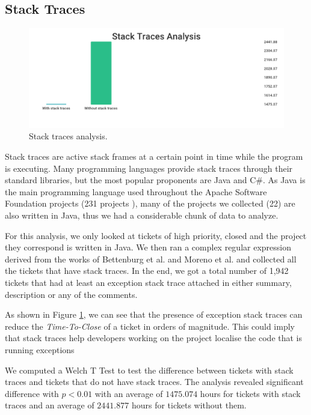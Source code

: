 \documentclass{mpaper}
\begin{document}
\vskip12pt

\subsection{Stack Traces}

\begin{figure}[ht]
  \begin{center}
    \includegraphics[scale=0.25]{images/stack_traces.png}
  \end{center}
  \caption{\label{stack_traces}Stack traces analysis.}
\end{figure}

Stack traces are active stack frames at a certain point in time while the program is executing. 
Many programming languages provide stack traces through their standard libraries, but the most 
popular proponents are Java and C\#. As Java is the main programming language used throughout 
the Apache Software Foundation projects (231 projects \cite{apache_projects}), many of the projects 
we collected (22) are also written in Java, thus we had a considerable chunk of data to analyze.

For this analysis, we only looked at tickets of high priority, closed and the project they correspond 
is written in Java. We then ran a complex regular expression derived from the works of Bettenburg et al. 
\cite{bettenburg2012using} and Moreno et al. \cite{moreno2014use} and collected all the tickets that have 
stack traces. In the end, we got a total number of 1,942 tickets that had at least an exception stack trace 
attached in either summary, description or any of the comments.

As shown in Figure \ref{stack_traces}, we can see that the presence of exception stack traces can 
reduce the \emph{Time-To-Close} of a ticket in orders of magnitude. This could imply that stack traces help 
developers working on the project localise the code that is running exceptions 

We computed a Welch T Test to test the difference between tickets with stack traces and tickets that 
do not have stack traces. The analysis revealed significant difference with $p < 0.01$ with an
average of $1475.074$ hours for tickets with stack traces and an average of $2441.877$ hours
for tickets without them.
\end{document}
